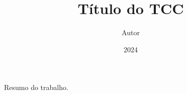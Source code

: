 \documentclass{abntex2}
\title{Título do TCC}
\author{Autor}
\date{2024}
\begin{document}
\maketitle

\begin{resumo}
Resumo do trabalho.
\end{resumo}

\tableofcontents




\end{document}
